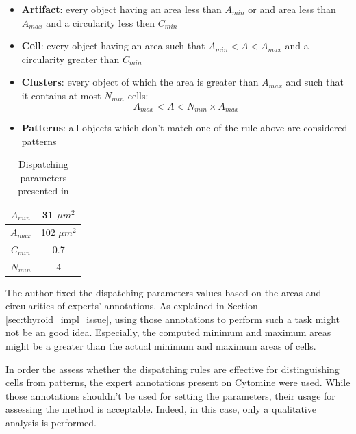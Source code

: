 \begin{itemize}
	\item \textbf{Artifact}: every object having an area less than $A_{min}$ or and area less than $A_{max}$ and a circularity less then $C_{min}$
	\item \textbf{Cell}: every object having an area such that $A_{min} < A < A_{max}$ and a circularity greater than $C_{min}$
	\item \textbf{Clusters}: every object of which the area is greater than $A_{max}$ and such that it contains at most $N_{min}$ cells:
	\[
		A_{max} < A < N_{min} \times A_{max}
	\]
	\item \textbf{Patterns}: all objects which don't match one of the rule above are considered patterns
\end{itemize}

\begin{table}
	\center
	\begin{tabular}{|c|c|}
		\hline
		$A_{min}$ & 31 $\mu m^2$\\
		\hline
		$A_{max}$ & 102 $\mu m^2$\\
		\hline
		$C_{min}$ & 0.7 \\
		\hline
		$N_{min}$ & 4\\
		\hline
	\end{tabular}
	\caption{Dispatching parameters presented in \cite{adeblire2013}}
	\label{tab:adeb_disp_rules}
\end{table}

The author fixed the dispatching parameters values based on the areas and circularities of experts' annotations. As explained in Section \ref{sec:thyroid_impl_issue}, using those annotations to perform such a task might not be an good idea. Especially, the computed minimum and maximum areas might be a greater than the actual minimum and maximum areas of cells. 

In order the assess whether the dispatching rules are effective for distinguishing cells from patterns, the expert annotations present on Cytomine were used. While those annotations shouldn't be used for setting the parameters, their usage for assessing the method is acceptable. Indeed, in this case, only a qualitative analysis is performed. 

